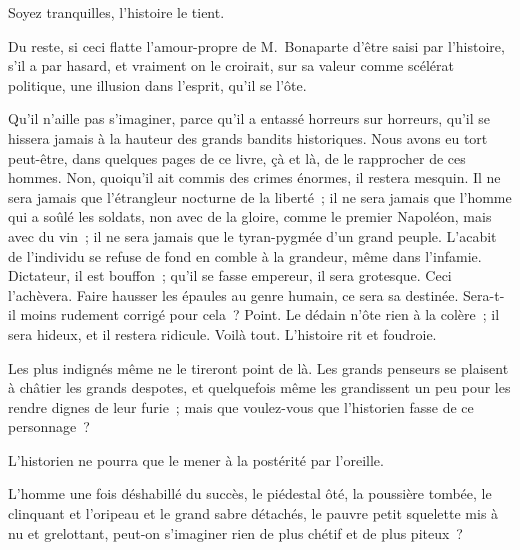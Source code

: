 \documentclass[french,twoside]{book} %
\begin{document}
Soyez tranquilles, l’histoire le tient.\par
Du reste, si ceci flatte l’amour-propre de M. Bonaparte d’être saisi par l’histoire, s’il a par hasard, et vraiment on le croirait, sur sa valeur comme scélérat politique, une illusion dans l’esprit, qu’il se l’ôte.\par
Qu’il n’aille pas s’imaginer, parce qu’il a entassé horreurs sur horreurs, qu’il se hissera jamais à la hauteur des grands bandits historiques. Nous avons eu tort peut-être, dans quelques pages de ce livre, çà et là, de le rapprocher de ces hommes. Non, quoiqu’il ait commis des crimes énormes, il restera mesquin. Il ne sera jamais que l’étrangleur nocturne de la liberté ; il ne sera jamais que l’homme qui a soûlé les soldats, non avec de la gloire, comme le premier Napoléon, mais avec du vin ; il ne sera jamais que le tyran-pygmée d’un grand peuple. L’acabit de l’individu se refuse de fond en comble à la grandeur, même dans l’infamie. Dictateur, il est bouffon ; qu’il se fasse empereur, il sera grotesque. Ceci l’achèvera. Faire hausser les épaules au genre humain, ce sera sa destinée. Sera-t-il moins rudement corrigé pour cela ? Point. Le dédain n’ôte rien à la colère ; il sera hideux, et il restera ridicule. Voilà tout. L’histoire rit et foudroie.\par
Les plus indignés même ne le tireront point de là. Les grands penseurs se plaisent à châtier les grands despotes, et quelquefois même les grandissent un peu pour les rendre dignes de leur furie ; mais que voulez-vous que l’historien fasse de ce personnage ?\par
L’historien ne pourra que le mener à la postérité par l’oreille.\par
L’homme une fois déshabillé du succès, le piédestal ôté, la poussière tombée, le clinquant et l’oripeau et le grand sabre détachés, le pauvre petit squelette mis à nu et grelottant, peut-on s’imaginer rien de plus chétif et de plus piteux ?\par
\end{document}
